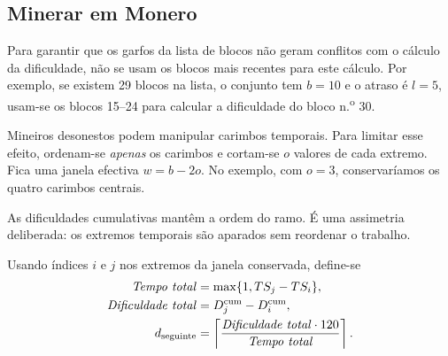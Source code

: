 \subsection{Minerar em Monero} %

Para garantir que os garfos da lista de blocos não geram conflitos com o
cálculo da dificuldade, não se usam os blocos mais recentes para este cálculo.
Por exemplo, se existem 29 blocos na lista, o conjunto tem $b=10$ e o atraso é
$l=5$, usam-se os blocos 15--24 para calcular a dificuldade do bloco n.\textsuperscript{o} 30.

Mineiros desonestos podem manipular carimbos temporais. Para limitar esse
efeito, ordenam-se \emph{apenas} os carimbos e cortam-se $o$ valores de cada
extremo. Fica uma janela efectiva $w=b-2o$. No exemplo, com $o=3$, conservaríamos
os quatro carimbos centrais.

As dificuldades cumulativas mantêm a ordem do ramo. É uma assimetria
deliberada: os extremos temporais são aparados sem reordenar o trabalho.

Usando índices $i$ e $j$ nos extremos
da janela conservada, define-se
\begin{align*}
\mathit{Tempo\ total} &= \max\{1, TS_{j}-TS_{i}\},\\
\mathit{Dificuldade\ total} &= D^{\rm cum}_{j}-D^{\rm cum}_{i},\\
d_{\rm seguinte} &=
\left\lceil\frac{\mathit{Dificuldade\ total}\cdot120}
{\mathit{Tempo\ total}}\right\rceil.
\end{align*}


